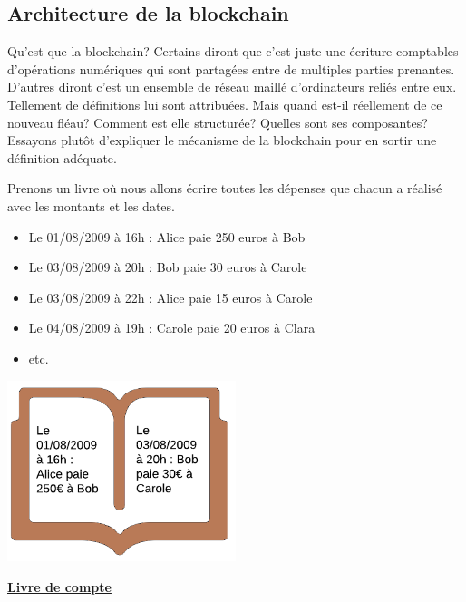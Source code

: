 \documentclass[12pt]{report}
\begin{document}

\newpage
	\subsection{Architecture de la blockchain}

\hspace{1cm} Qu'est que la blockchain? Certains diront que c'est juste une écriture comptables d'opérations numériques qui sont partagées entre de multiples parties prenantes. D'autres diront c'est un ensemble de réseau maillé d'ordinateurs reliés entre eux. Tellement de définitions lui sont attribuées. Mais quand est-il réellement de ce nouveau fléau? Comment est elle structurée? Quelles sont ses composantes? Essayons plutôt d'expliquer le mécanisme de la blockchain pour en sortir une définition adéquate.

\hspace{1cm} Prenons un livre où nous allons écrire toutes les dépenses que chacun a réalisé avec les montants et les dates.

\begin{itemize}
    \item Le 01/08/2009 à 16h : Alice paie 250 euros à Bob 
    \item Le 03/08/2009 à 20h : Bob paie 30 euros à Carole
    \item Le 03/08/2009 à 22h : Alice paie 15 euros  à Carole
    \item Le 04/08/2009 à 19h : Carole paie 20 euros  à Clara
    \item etc.
\end{itemize}

\begin{center}
    \includegraphics[width=0.5\textwidth]{livre_compte}

    \textbf{\underline{Livre de compte}} \\[1cm]
\end{center}
\end{document}
